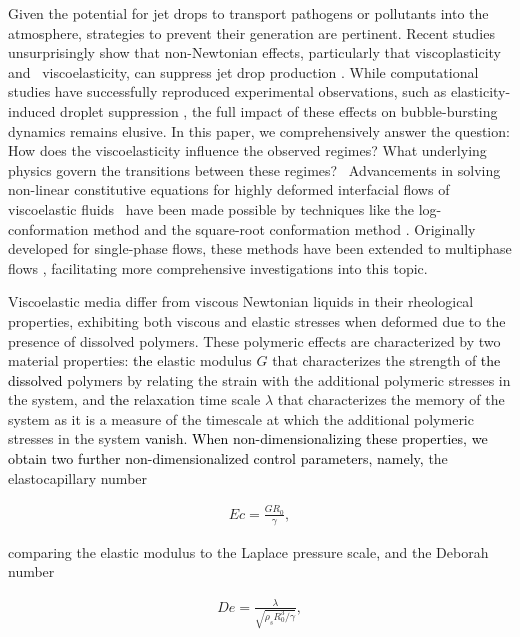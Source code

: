 \documentclass{jfm}
\newcommand{\DL}[1]{{\textcolor{black}{#1}}}
\newcommand{\AO}[1]{{\textcolor{black}{#1}}}
\newcommand{\oo}{\color{magenta} \normalfont}
\newcommand{\bb}{\color{black} \normalfont}
\begin{document}
Given the potential for jet drops to transport pathogens or pollutants into the atmosphere, strategies to prevent their generation are pertinent. Recent studies unsurprisingly show that non-Newtonian effects, particularly that \oo viscoplasticity and\bb\, viscoelasticity, can suppress jet drop production \citep{sanjay2021bursting, sen2021retraction, rodriguez2023bubble, ji2023secondary}.
While computational studies have successfully reproduced experimental observations, such as elasticity-induced droplet suppression \citep{cabalganteeffect, ari2024bursting}, the full impact of these effects on bubble-bursting dynamics remains elusive. \oo In this paper, we comprehensively answer the question: How does the viscoelasticity influence the observed regimes? What underlying physics govern the transitions between these regimes?\bb\,
Advancements in solving non-linear constitutive equations for highly deformed interfacial flows of \oo viscoelastic fluids\bb\, have been made possible by techniques like the log-conformation method \citep{fattal2004constitutive} and the square-root conformation method \citep{balci2011symmetric}.
Originally developed for single-phase flows, these methods have been extended to multiphase flows \citep{fraggedakis2016velocity,lopez2019adaptive,varchanis2022numerical,francca2024elasto,zinelis2023transition},
facilitating more comprehensive investigations into this topic.

Viscoelastic media differ from viscous Newtonian liquids in their rheological properties, exhibiting both viscous and elastic stresses when deformed due to the presence of dissolved polymers.
These polymeric effects are characterized by two material properties: \DL{the} elastic modulus $G$ that characterizes the strength of \DL{the dissolved} polymers by relating the strain with the additional polymeric stresses in the system, and \DL{the} relaxation time scale $\lambda$ that characterizes the memory of the system as it is a measure of the timescale at which the additional polymeric stresses in the system \AO{vanish}. \DL{When non-dimensionalizing these properties, we obtain two further non-dimensionalized control parameters, namely,} the elastocapillary number

\begin{align}
	\label{eq:Ecdef}
	Ec = \frac{GR_0}{\gamma},
\end{align}

\noindent comparing the elastic modulus to the Laplace pressure scale\DL{,} and the Deborah number

\begin{align}
	\label{eq:Dedef}
	De = \frac{\lambda}{\sqrt{\rho_sR_0^3/\gamma}},
\end{align}
\end{document}
